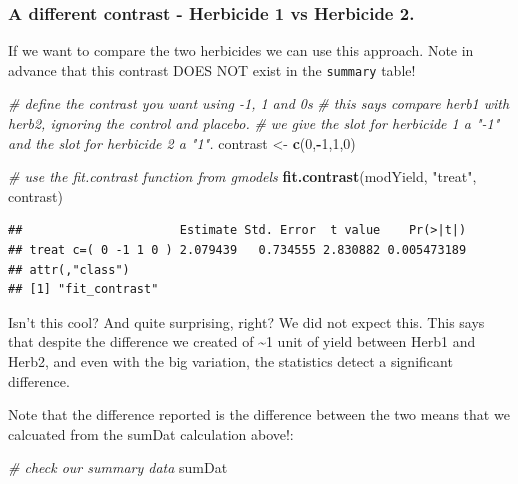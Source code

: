 \documentclass[
]{book}
\newenvironment{Shaded}{\begin{snugshade}}{\end{snugshade}}
\newcommand{\CommentTok}[1]{\textcolor[rgb]{0.56,0.35,0.01}{\textit{#1}}}
\newcommand{\DecValTok}[1]{\textcolor[rgb]{0.00,0.00,0.81}{#1}}
\newcommand{\FunctionTok}[1]{\textcolor[rgb]{0.13,0.29,0.53}{\textbf{#1}}}
\newcommand{\NormalTok}[1]{#1}
\newcommand{\OtherTok}[1]{\textcolor[rgb]{0.56,0.35,0.01}{#1}}
\newcommand{\SpecialCharTok}[1]{\textcolor[rgb]{0.81,0.36,0.00}{\textbf{#1}}}
\newcommand{\StringTok}[1]{\textcolor[rgb]{0.31,0.60,0.02}{#1}}
\begin{document}
\hypertarget{a-different-contrast---herbicide-1-vs-herbicide-2.}{%
\subsubsection{A different contrast - Herbicide 1 vs Herbicide 2.}\label{a-different-contrast---herbicide-1-vs-herbicide-2.}}

If we want to compare the two herbicides we can use this approach. Note in advance that this contrast DOES NOT exist in the \texttt{summary} table!

\begin{Shaded}
\begin{Highlighting}[]
\CommentTok{\# define the contrast you want using {-}1, 1 and 0\textquotesingle{}s}
\CommentTok{\# this says compare herb1 with herb2, ignoring the control and placebo.}
\CommentTok{\# we give the slot for herbicide 1 a "{-}1" and the slot for herbicide 2 a "1".}
\NormalTok{contrast }\OtherTok{\textless{}{-}} \FunctionTok{c}\NormalTok{(}\DecValTok{0}\NormalTok{,}\SpecialCharTok{{-}}\DecValTok{1}\NormalTok{,}\DecValTok{1}\NormalTok{,}\DecValTok{0}\NormalTok{)}

\CommentTok{\# use the fit.contrast function from gmodels}
\FunctionTok{fit.contrast}\NormalTok{(modYield, }\StringTok{"treat"}\NormalTok{, contrast)}
\end{Highlighting}
\end{Shaded}

\begin{verbatim}
##                      Estimate Std. Error  t value    Pr(>|t|)
## treat c=( 0 -1 1 0 ) 2.079439   0.734555 2.830882 0.005473189
## attr(,"class")
## [1] "fit_contrast"
\end{verbatim}

Isn't this cool? And quite surprising, right? We did not expect this. This says that despite the difference we created of \textasciitilde1 unit of yield between Herb1 and Herb2, and even with the big variation, the statistics detect a significant difference.

Note that the difference reported is the difference between the two means that we calcuated from the sumDat calculation above!:

\begin{Shaded}
\begin{Highlighting}[]
\CommentTok{\# check our summary data}
\NormalTok{sumDat}
\end{Highlighting}
\end{Shaded}
\end{document}
